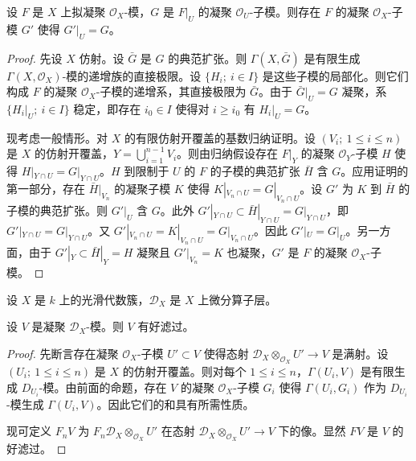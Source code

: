 \begin{proposition}
设 $F$ 是 $X$ 上拟凝聚 $\mathcal{O}_X$-模，$G$ 是 $F|_U$ 的凝聚 $\mathcal{O}_U$-子模。则存在 $F$ 的凝聚 $\mathcal{O}_X$-子模 $G'$ 使得 $G'|_U=G$。
\end{proposition}

\begin{proof}
先设 $X$ 仿射。设 $\bar G$ 是 $G$ 的典范扩张。则 $\Gamma(X,\bar G)$ 是有限生成 $\Gamma(X,\mathcal{O}_X)$-模的递增族的直接极限。设 $\{H_i;\ i\in I\}$ 是这些子模的局部化。则它们构成 $F$ 的凝聚 $\mathcal{O}_X$-子模的递增系，其直接极限为 $\bar G$。由于 $\bar G|_U=G$ 凝聚，系 $\{H_i|_U;\ i\in I\}$ 稳定，即存在 $i_0\in I$ 使得对 $i\ge i_0$ 有 $H_i|_U=G$。

现考虑一般情形。对 $X$ 的有限仿射开覆盖的基数归纳证明。设 $(V_i;\ 1\le i\le n)$ 是 $X$ 的仿射开覆盖，$Y=\bigcup_{i=1}^{n-1}V_i$。则由归纳假设存在 $F|_Y$ 的凝聚 $\mathcal{O}_Y$-子模 $H$ 使得 $H|_{Y\cap U}=G|_{Y\cap U}$。$H$ 到限制于 $U$ 的 $F$ 的子模的典范扩张 $\bar H$ 含 $G$。应用证明的第一部分，存在 $\bar H|_{V_n}$ 的凝聚子模 $K$ 使得 $K|_{V_n\cap U}=G|_{V_n\cap U}$。设 $G'$ 为 $K$ 到 $\bar H$ 的子模的典范扩张。则 $G'|_U$ 含 $G$。此外 $G'|_{Y\cap U}\subset\bar H|_{Y\cap U}=G|_{Y\cap U}$，即 $G'|_{Y\cap U}=G|_{Y\cap U}$。又 $G'|_{V_n\cap U}=K|_{V_n\cap U}=G|_{V_n\cap U}$。因此 $G'|_U=G|_U$。另一方面，由于 $G'|_Y\subset\bar H|_Y=H$ 凝聚且 $G'|_{V_n}=K$ 也凝聚，$G'$ 是 $F$ 的凝聚 $\mathcal{O}_X$-子模。
\end{proof}

设 $X$ 是 $k$ 上的光滑代数簇，$\mathcal{D}_X$ 是 $X$ 上微分算子层。

\begin{theorem}
设 $V$ 是凝聚 $\mathcal{D}_X$-模。则 $V$ 有好滤过。
\end{theorem}

\begin{proof}
先断言存在凝聚 $\mathcal{O}_X$-子模 $U'\subset V$ 使得态射 $\mathcal{D}_X\otimes_{\mathcal{O}_X}U'\to V$ 是满射。设 $(U_i;\ 1\le i\le n)$ 是 $X$ 的仿射开覆盖。则对每个 $1\le i\le n$，$\Gamma(U_i,V)$ 是有限生成 $D_{U_i}$-模。由前面的命题，存在 $V$ 的凝聚 $\mathcal{O}_X$-子模 $G_i$ 使得 $\Gamma(U_i,G_i)$ 作为 $D_{U_i}$-模生成 $\Gamma(U_i,V)$。因此它们的和具有所需性质。

现可定义 $F_nV$ 为 $F_n\mathcal{D}_X\otimes_{\mathcal{O}_X}U'$ 在态射 $\mathcal{D}_X\otimes_{\mathcal{O}_X}U'\to V$ 下的像。显然 $F V$ 是 $V$ 的好滤过。
\end{proof}

